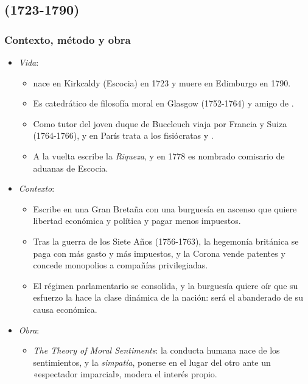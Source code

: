\documentclass[11pt]{article}
\begin{document}
\subsection{ (1723-1790)}\label{sec:smith}

\subsubsection{Contexto, método y obra}\label{sec:smith-contexto}

\begin{itemize}
\item \emph{Vida}:
  \begin{itemize}
  \item {} nace en Kirkcaldy (Escocia) en 1723 y muere en Edimburgo en 1790\nocite{Otteson2026Smith,Glasgow2026Smith}.
  \item Es catedrático de filosofía moral en Glasgow (1752-1764) y amigo de .
  \item Como tutor del joven duque de Buccleuch viaja por Francia y Suiza (1764-1766), y en París trata a los fisiócratas  y .
  \item A la vuelta escribe la \emph{Riqueza}, y en 1778 es nombrado comisario de aduanas de Escocia.
  \end{itemize}
\item \emph{Contexto}:
  \begin{itemize}
  \item Escribe en una Gran Bretaña con una burguesía en ascenso que quiere libertad económica y política y pagar menos impuestos.
  \item Tras la guerra de los Siete Años (1756-1763), la hegemonía británica se paga con más gasto y más impuestos, y la Corona vende patentes y concede monopolios a compañías privilegiadas.
  \item El régimen parlamentario se consolida, y la burguesía quiere oír que su esfuerzo la hace la clase dinámica de la nación:  será el abanderado de su causa económica.
  \end{itemize}
\item \emph{Obra}:
  \begin{itemize}
  \item \emph{The Theory of Moral Sentiments}\nocite{Smith1759Theory}: la conducta humana nace de los sentimientos, y la \emph{simpatía}, ponerse en el lugar del otro ante un «espectador imparcial», modera el interés propio.

\end{itemize}
\end{itemize}
\end{document}
